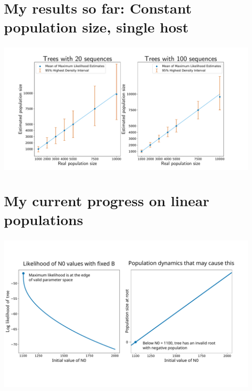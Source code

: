 \documentclass[aspectratio=169]{beamer}
\begin{document}
\section{My results so far: Constant population size, single host}

\begin{frame} \frametitle{\insertsection}

    \centering\includegraphics[width=\textwidth]{images/constant-accuracy}

\end{frame}

\section{My current progress on linear populations}

\begin{frame} \frametitle{\insertsection}

    \centering\includegraphics[width=\textwidth]{images/linear-progress}

\end{frame}
\end{document}
